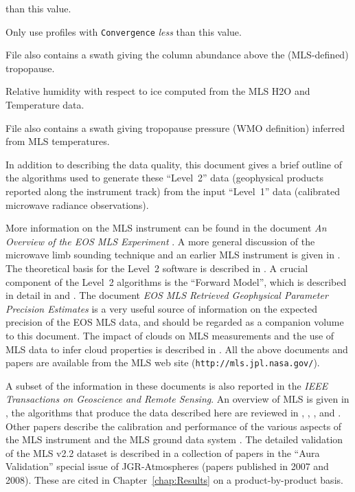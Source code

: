 \documentclass[11pt,draft]{report}
\begin{document}
\begin{table}
{\begin{tablenotes}
    than this value.
  \item[\mbox{[2]}] Only use profiles with \texttt{Convergence} \emph{less} than this value.
  \item[\mbox{[3]}] File also contains a swath giving the column
    abundance above the (MLS-defined) tropopause.
  \item[\mbox{[4]}] Relative humidity with respect to ice computed from the
    MLS H\cs2O and Temperature data.
  \item[\mbox{[5]}] File also contains a swath giving tropopause
    pressure (WMO definition) inferred from MLS temperatures.
  \end{tablenotes}}

\end{table}

 
In addition to describing the data quality, this document gives a brief
outline of the algorithms used to generate these ``Level~2'' data
(geophysical products reported along the instrument track) from the
input ``Level~1'' data (calibrated microwave radiance observations).

More information on the MLS instrument can be found in the document
\emph{An Overview of the EOS MLS Experiment} \citep{EOSMLSOverview}.  A
more general discussion of the microwave limb sounding technique and an
earlier MLS instrument is given in \citet{WatersEtal99}.  The
theoretical basis for the Level~2 software is described in
\citet{EOSMLSL2ATBD}.  A crucial component of the Level~2 algorithms is
the ``Forward Model'', which is described in detail in
\citet{EOSMLSFWMATBD} and \citet{EOSMLSPolarizedFWMATBD}.  The document
\emph{EOS MLS Retrieved Geophysical Parameter Precision Estimates}
\citep{EOSMLSPrecision} is a very useful source of information on the
expected precision of the EOS MLS data, and should be regarded as a
companion volume to this document.  The impact of clouds on MLS
measurements and the use of MLS data to infer cloud properties is
described in \cite{EOSMLSCloudATBD}.  All the above documents and papers
are available from the MLS web site (\texttt{http://mls.jpl.nasa.gov/}).

A subset of the information in these documents is also reported in the
\emph{IEEE Transactions on Geoscience and Remote Sensing}.  An overview
of MLS is given in \cite{WatersEtal06}, the algorithms that produce the
data described here are reviewed in \citet{LiveseyEtal06},
\citet{ReadEtal06}, \citet{SchwartzEtal06}, and \citet{WuEtal06}\@.
Other papers describe the calibration and performance of the various
aspects of the MLS instrument
\citep{JarnotEtal06,Pickett06,CofieldAndStek06} and the MLS ground data
system \citep{CuddyEtal06}.  The detailed validation of the MLS v2.2
dataset is described in a collection of papers in the ``Aura
Validation'' special issue of JGR-Atmospheres (papers published in 2007
and 2008).  These are cited in Chapter~\ref{chap:Results} on a
product-by-product basis.
\end{document}
